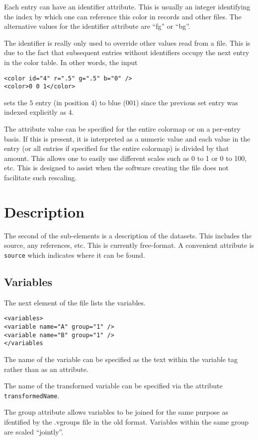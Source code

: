 \documentclass{article}
\def\XMLAttribute#1{\Escape{#1}}
\begin{document}
Each entry can have an identifier attribute.  This is usually an
integer identifying the index by which one can reference this color in
records and other files.  The alternative values for the identifier
attribute are ``fg'' or ``bg''.

The identifier is really only used to override other values read from
a file.  This is due to the fact that subsequent entries without
identifiers occupy the next entry  in the color table.
In other words, the input
\begin{verbatim}
<color id="4" r=".5" g=".5" b="0" />
<color>0 0 1</color>
\end{verbatim}
sets the $5$ entry (in position $4$) to blue ($0 0 1$) since the
previous set entry was indexed explicitly as $4$.


The attribute \XMLAttribute{range} value can be specified for the entire
colormap or on a per-entry basis.  If this is present, it is
interpreted as a numeric value and each value in the entry (or all
entries if specified for the entire colormap) is divided by that
amount.  This allows one to easily use different scales such as 0 to 1
or 0 to 100, etc. This is designed to assist when the software
creating the file does not facilitate such rescaling.


\section{Description}

The second of the sub-elements is a description of the datasets.  This
includes the source, any references, etc.  This is currently
free-format.  A convenient attribute is \texttt{source} which
indicates where it can be found.

\subsection{Variables}
The next element of the file 
lists the variables.
\begin{verbatim}
<variables>
<variable name="A" group="1" />
<variable name="B" group="1" />
</variables
\end{verbatim}
The name of the variable
can be specified as the text within the
variable tag rather than as an attribute.

The name of the transformed variable can be specified via the
attribute \texttt{transformedName}.

The group attribute allows variables to be joined for the same purpose
as ifentified by the .vgroups file in the old format.  Variables
within the same group are scaled ``jointly''.
\end{document}
